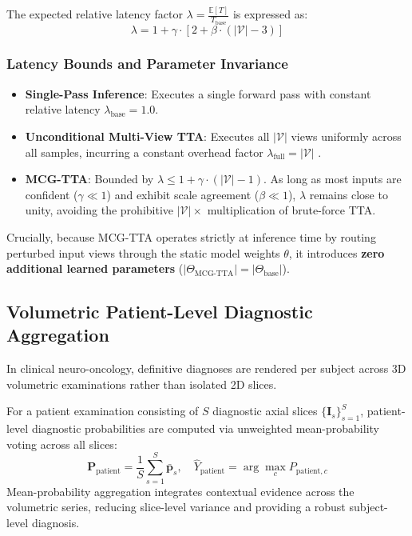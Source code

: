 ﻿\documentclass[journal]{IEEEtran}
\begin{document}
The expected relative latency factor $\lambda = \frac{\mathbb{E}[T]}{T_{\text{base}}}$ is expressed as:
\begin{equation}
\lambda = 1 + \gamma \cdot \left[ 2 + \beta \cdot (|\mathcal{V}| - 3) \right]
\label{eq:latency}
\end{equation}

\subsubsection{Latency Bounds and Parameter Invariance}
\begin{itemize}
\item \textbf{Single-Pass Inference}: Executes a single forward pass with constant relative latency $\lambda_{\text{base}} = 1.0$.
\item \textbf{Unconditional Multi-View TTA}: Executes all $|\mathcal{V}|$ views uniformly across all samples, incurring a constant overhead factor $\lambda_{\text{full}} = |\mathcal{V}|$ \cite{58}.
\item \textbf{MCG-TTA}: Bounded by $\lambda \le 1 + \gamma \cdot (|\mathcal{V}| - 1)$. As long as most inputs are confident ($\gamma \ll 1$) and exhibit scale agreement ($\beta \ll 1$), $\lambda$ remains close to unity, avoiding the prohibitive $|\mathcal{V}|\times$ multiplication of brute-force TTA.
\end{itemize}

Crucially, because MCG-TTA operates strictly at inference time by routing perturbed input views through the static model weights $\theta$, it introduces \textbf{zero additional learned parameters} ($|\Theta_{\text{MCG-TTA}}| = |\Theta_{\text{base}}|$).

\subsection{Volumetric Patient-Level Diagnostic Aggregation}

In clinical neuro-oncology, definitive diagnoses are rendered per subject across 3D volumetric examinations rather than isolated 2D slices. 

For a patient examination consisting of $S$ diagnostic axial slices $\{\mathbf{I}_s\}_{s=1}^S$, patient-level diagnostic probabilities are computed via unweighted mean-probability voting across all slices:
\begin{equation}
\mathbf{P}_{\text{patient}} = \frac{1}{S} \sum_{s=1}^S \bar{\mathbf{p}}_s, \quad \hat{Y}_{\text{patient}} = \arg\max_{c} P_{\text{patient}, c}
\label{eq:patient_aggregation}
\end{equation}
Mean-probability aggregation integrates contextual evidence across the volumetric series, reducing slice-level variance and providing a robust subject-level diagnosis.
\end{document}
